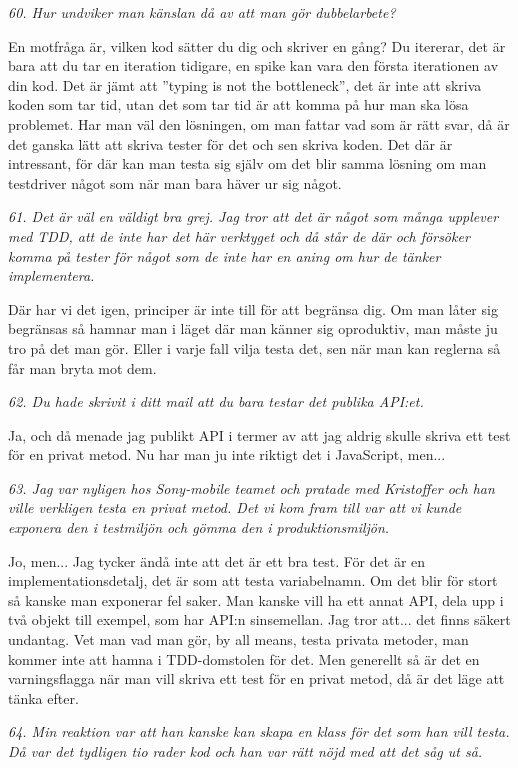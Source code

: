\documentclass[11pt]{article}
\begin{document}
\emph{60. Hur undviker man känslan då av att man gör dubbelarbete?}

En motfråga är, vilken kod sätter du dig och skriver en gång? Du itererar, det är bara att du tar en iteration tidigare, en spike kan vara den första iterationen av din kod. Det är jämt att ”typing is not the bottleneck”, det är inte att skriva koden som tar tid, utan det som tar tid är att komma på hur man ska lösa problemet. Har man väl den lösningen, om man fattar vad som är rätt svar, då är det ganska lätt att skriva tester för det och sen skriva koden. Det där är intressant, för där kan man testa sig själv om det blir samma lösning om man testdriver något som när man bara häver ur sig något.

\emph{61. Det är väl en väldigt bra grej. Jag tror att det är något som många upplever med TDD, att de inte har det här verktyget och då står de där och försöker komma på tester för något som de inte har en aning om hur de tänker implementera.}

Där har vi det igen, principer är inte till för att begränsa dig. Om man låter sig begränsas så hamnar man i läget där man känner sig oproduktiv, man måste ju tro på det man gör. Eller i varje fall vilja testa det, sen när man kan reglerna så får man bryta mot dem.

\emph{62. Du hade skrivit i ditt mail att du bara testar det publika API:et.}

Ja, och då menade jag publikt API i termer av att jag aldrig skulle skriva ett test för en privat metod. Nu har man ju inte riktigt det i JavaScript, men...

\emph{63. Jag var nyligen hos Sony-mobile teamet och pratade med Kristoffer och han ville verkligen testa en privat metod. Det vi kom fram till var att vi kunde exponera den i testmiljön och gömma den i produktionsmiljön.}

Jo, men... Jag tycker ändå inte att det är ett bra test. För det är en implementationsdetalj, det är som att testa variabelnamn. Om det blir för stort så kanske man exponerar fel saker.  Man kanske vill ha ett annat API, dela upp i två objekt till exempel, som har API:n sinsemellan. Jag tror att... det finns säkert undantag. Vet man vad man gör, by all means, testa privata metoder, man kommer inte att hamna i TDD-domstolen för det. Men generellt så är det en varningsflagga när man vill skriva ett test för en privat metod, då är det läge att tänka efter.

\emph{64. Min reaktion var att han kanske kan skapa en klass för det som han vill testa. Då var det tydligen tio rader kod och han var rätt nöjd med att det såg ut så.}
\end{document}
